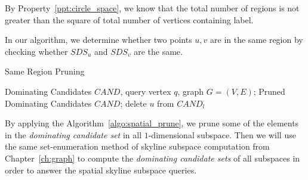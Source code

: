 By Property~\ref{ppt:circle_space}, we know that the total number of regions is not greater than the square of total number of vertices containing label. 

In our algorithm, we determine whether two points $u, v$ are in the same region by checking whether $SDS_u$ and $SDS_v$ are the same.

\begin{algorithm}[H]
  \caption{Same Region Pruning}
  \label{algo:spatial_prune}
  \begin{algorithmic}[1]
  \show\LOOP
    \REQUIRE Dominating Candidates $CAND$, query vertex $q$, graph $G=(V, E)$;
    \ENSURE Pruned Dominating Candidates $CAND$;
                \STATE delete $u$ from $CAND_l$
            \ENDIF
        \ENDFOR
    \ENDFOR
  \end{algorithmic}
\end{algorithm}

By applying the Algorithm~\ref{algo:spatial_prune}, we prune some of the elements in the \emph{dominating candidate set} in all $1$-dimensional subspace. Then we will use the same set-enumeration method of skyline subspace computation from Chapter~\ref{ch:graph} to compute the \emph{dominating candidate sets} of all subspaces in order to answer the spatial skyline subspace queries.










